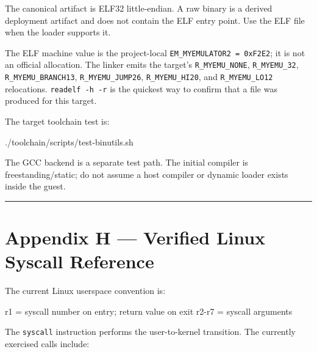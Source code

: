 \documentclass[
  oneside,
  openany]{book}
\newenvironment{Shaded}{\begin{snugshade}}{\end{snugshade}}
\newcommand{\ExtensionTok}[1]{#1}
\newcommand{\NormalTok}[1]{#1}
\begin{document}
The canonical artifact is ELF32 little-endian. A raw binary is a derived
deployment artifact and does not contain the ELF entry point. Use the
ELF file when the loader supports it.

The ELF machine value is the project-local
\texttt{EM\_MYEMULATOR2\ =\ 0xF2E2}; it is not an official allocation.
The linker emits the target's \texttt{R\_MYEMU\_NONE},
\texttt{R\_MYEMU\_32}, \texttt{R\_MYEMU\_BRANCH13},
\texttt{R\_MYEMU\_JUMP26}, \texttt{R\_MYEMU\_HI20}, and
\texttt{R\_MYEMU\_LO12} relocations. \texttt{readelf\ -h\ -r} is the
quickest way to confirm that a file was produced for this target.

The target toolchain test is:

\begin{Shaded}
\begin{Highlighting}[]
\ExtensionTok{./toolchain/scripts/test{-}binutils.sh}
\end{Highlighting}
\end{Shaded}

The GCC backend is a separate test path. The initial compiler is
freestanding/static; do not assume a host compiler or dynamic loader
exists inside the guest.

\begin{center}\rule{0.5\linewidth}{0.5pt}\end{center}

\hypertarget{appendix-h-verified-linux-syscall-reference}{%
\chapter{Appendix H --- Verified Linux Syscall
Reference}\label{appendix-h-verified-linux-syscall-reference}}

The current Linux userspace convention is:

\begin{Shaded}
\begin{Highlighting}[]
\NormalTok{r1 = syscall number on entry; return value on exit}
\NormalTok{r2{-}r7 = syscall arguments}
\end{Highlighting}
\end{Shaded}

The \texttt{syscall} instruction performs the user-to-kernel transition.
The currently exercised calls include:
\end{document}
